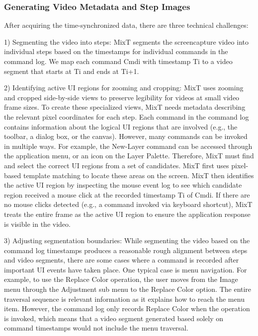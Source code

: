 \subsubsection{Generating Video Metadata and Step Images}
After acquiring the time-synchronized data, there are three technical challenges:

1) Segmenting the video into steps: MixT segments the screencapture video into individual steps based on the timestamps for individual commands in the command log. We map each command Cmdi with timestamp Ti to a video segment that starts at Ti and ends at Ti+1.

2) Identifying active UI regions for zooming and cropping: MixT uses zooming and cropped side-by-side views to preserve legibility for videos at small video frame sizes. To create these specialized views, MixT needs metadata describing the relevant pixel coordinates for each step. Each command in the command log contains information about the logical UI regions that are involved (e.g., the toolbar, a dialog box, or the canvas). However, many commands can be invoked in multiple ways. For example, the New-Layer command can be accessed through the application menu, or an icon on the Layer Palette. Therefore, MixT must find and select the correct UI regions from a set of candidates. MixT first uses pixel-based template matching \cite{Pongnumkul:2011ju} to locate these areas on the screen. MixT then identifies the active UI region by inspecting the mouse event log to see which candidate region received a mouse click at the recorded timestamp Ti of Cmdi. If there are no mouse clicks detected (e.g., a command invoked via keyboard shortcut), MixT treats the entire frame as the active UI region to ensure the application response is visible in the video.

3) Adjusting segmentation boundaries: While segmenting the video based on the command log timestamps produces a reasonable rough alignment between steps and video segments, there are some cases where a command is recorded after important UI events have taken place. One typical case is menu navigation. For example, to use the Replace Color operation, the user moves from the Image menu through the Adjustment sub menu to the Replace Color option. The entire traversal sequence is relevant information as it explains how to reach the menu item. However, the command log only records Replace Color when the operation is invoked, which means that a video segment generated based solely on command timestamps would not include the menu traversal.


